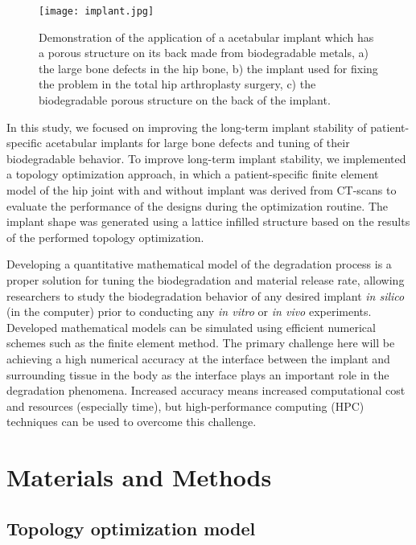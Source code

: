 \begin{figure}[h]
\centering
\medskip
\texttt{[image: implant.jpg]}
\caption[Application of the acetabular implant]{Demonstration of the application of a acetabular implant which has a porous structure on its back made from biodegradable metals, a) the large bone defects in the hip bone, b) the implant used for fixing the problem in the total hip arthroplasty surgery, c) the biodegradable porous structure on the back of the implant. } \label{fig:cup_implant}
\end{figure}

In this study, we focused on improving the long-term implant stability of patient-specific acetabular implants for large bone defects and tuning of their biodegradable behavior. To improve long-term implant stability, we implemented a topology optimization approach, in which a patient-specific finite element model of the hip joint with and without implant was derived from CT-scans to evaluate the performance of the designs during the optimization routine. The implant shape was generated using a lattice infilled structure based on the results of the performed topology optimization.

Developing a quantitative mathematical model of the degradation process is a proper solution for tuning the biodegradation and material release rate, allowing researchers to study the biodegradation behavior of any desired implant \textit{in silico} (in the computer) prior to conducting any \textit{in vitro} or \textit{in vivo} experiments. Developed mathematical models can be simulated using efficient numerical schemes such as the finite element method. The primary challenge here will be achieving a high numerical accuracy at the interface between the implant and surrounding tissue in the body as the interface plays an important role in the degradation phenomena. Increased accuracy means increased computational cost and resources (especially time), but high-performance computing (HPC) techniques can be used to overcome this challenge.



\section{Materials and Methods}

\subsection{Topology optimization model}

